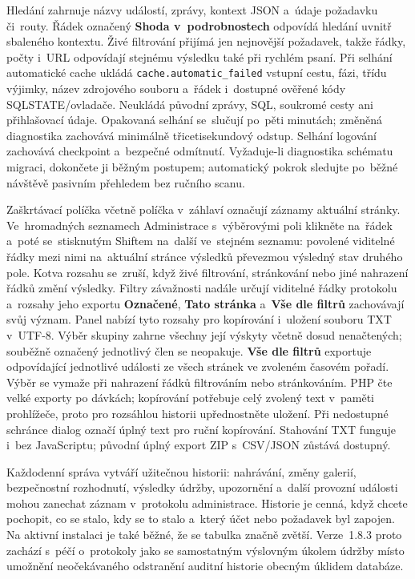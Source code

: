 \documentclass[11pt,a4paper]{article}
\newcommand{\version}{1.8.3}
\newcommand{\ui}[1]{\textbf{#1}}
\newcommand{\codeword}[1]{\nolinkurl{#1}}
\begin{document}
Hledání zahrnuje názvy událostí, zprávy, kontext JSON a~údaje požadavku
či~routy. Řádek označený \ui{Shoda v~podrobnostech} odpovídá hledání uvnitř
sbaleného kontextu. Živé filtrování přijímá jen nejnovější požadavek, takže
řádky, počty i~URL odpovídají stejnému výsledku také při rychlém psaní. Při
selhání automatické cache ukládá \codeword{cache.automatic\_failed} vstupní
cestu, fázi, třídu výjimky, název zdrojového souboru a~řádek i~dostupné ověřené
kódy SQLSTATE/ovladače. Neukládá původní zprávy, SQL, soukromé cesty ani
přihlašovací údaje. Opakovaná selhání se~slučují po~pěti minutách; změněná
diagnostika zachovává minimálně třicetisekundový odstup. Selhání logování
zachovává checkpoint a~bezpečné odmítnutí. Vyžaduje-li diagnostika schématu
migraci, dokončete ji běžným postupem; automatický pokrok sledujte po~běžné
návštěvě pasivním přehledem bez ručního scanu.

Zaškrtávací políčka včetně políčka v~záhlaví označují záznamy aktuální stránky.
Ve~hromadných seznamech Administrace s~výběrovými poli klikněte na~řádek a~poté
se~stisknutým Shiftem na~další ve~stejném seznamu: povolené viditelné řádky mezi
nimi na~aktuální stránce výsledků převezmou výsledný stav druhého pole. Kotva
rozsahu se~zruší, když živé filtrování, stránkování nebo jiné nahrazení řádků
změní výsledky. Filtry závažnosti nadále určují viditelné řádky protokolu
a~rozsahy jeho exportu \ui{Označené}, \ui{Tato stránka} a~\ui{Vše dle filtrů}
zachovávají svůj význam. Panel nabízí tyto rozsahy pro kopírování i~uložení
souboru TXT v~UTF-8. Výběr skupiny zahrne všechny její výskyty včetně dosud
nenačtených; souběžně označený jednotlivý člen se neopakuje. \ui{Vše dle filtrů}
exportuje odpovídající jednotlivé události ze všech stránek ve zvoleném časovém
pořadí. Výběr se vymaže při nahrazení řádků filtrováním nebo stránkováním. PHP
čte velké exporty po dávkách; kopírování potřebuje celý zvolený text v~paměti
prohlížeče, proto pro rozsáhlou historii upřednostněte uložení. Při nedostupné
schránce dialog označí úplný text pro ruční kopírování. Stahování TXT funguje
i~bez JavaScriptu; původní úplný export ZIP s~CSV/JSON zůstává dostupný.

Každodenní správa vytváří užitečnou historii: nahrávání, změny galerií,
bezpečnostní rozhodnutí, výsledky údržby, upozornění a~další provozní události
mohou zanechat záznam v~protokolu administrace. Historie je cenná, když chcete
pochopit, co se stalo, kdy se to stalo a~který účet nebo požadavek byl zapojen.
Na aktivní instalaci je také běžné, že se tabulka značně zvětší.
Verze~\version{} proto zachází s~péčí o~protokoly jako se samostatným výslovným
úkolem údržby místo umožnění neočekávaného odstranění auditní historie obecným
úklidem databáze.
\end{document}
